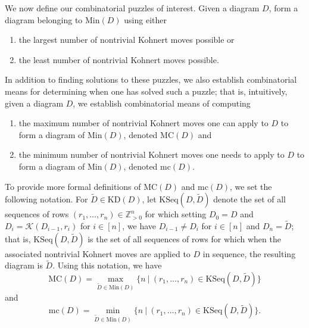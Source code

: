 \documentclass[letterpaper,10pt]{article}
\begin{document}
We now define our combinatorial puzzles of interest. Given a diagram $D$, form a diagram belonging to $\mathrm{Min}(D)$ using either
\begin{enumerate}
    \item[$(1)$] the largest number of nontrivial Kohnert moves possible or
    \item[$(2)$] the least number of nontrivial Kohnert moves possible.
\end{enumerate}
In addition to finding solutions to these puzzles, we also establish combinatorial means for determining when one has solved such a puzzle; that is, intuitively, given a diagram $D$, we establish combinatorial means of computing
\begin{enumerate}
    \item[$(1)$] the maximum number of nontrivial Kohnert moves one can apply to $D$ to form a diagram of $\mathrm{Min}(D)$, denoted $\mathrm{MC}(D)$ and
    \item[$(2)$] the minimum number of nontrivial Kohnert moves one needs to apply to $D$ to form a diagram of $\mathrm{Min}(D)$, denoted $\mathrm{mc}(D)$.
\end{enumerate}
To provide more formal definitions of $\mathrm{MC}(D)$ and $\mathrm{mc}(D)$, we set the following notation. For $\tilde{D}\in\mathrm{KD}(D)$, let $\mathrm{KSeq}(D,\tilde{D})$ denote the set of all sequences of rows $(r_1,\hdots,r_n)\in\mathbb{Z}_{>0}^n$ for which setting $D_0=D$ and $D_i=\mathcal{K}(D_{i-1},r_i)$ for $i\in[n]$, we have $D_{i-1}\neq D_i$ for $i\in [n]$ and $D_n=\tilde{D}$; that is, $\mathrm{KSeq}(D,\tilde{D})$ is the set of all sequences of rows for which when the associated nontrivial Kohnert moves are applied to $D$ in sequence, the resulting diagram is $\tilde{D}$. Using this notation, we have $$\mathrm{MC}(D)=\max_{\tilde{D}\in\mathrm{Min}(D)}\{n~|~(r_1,\hdots,r_n)\in \mathrm{KSeq}(D,\tilde{D})\}$$ and $$\mathrm{mc}(D)=\min_{\tilde{D}\in\mathrm{Min}(D)}\{n~|~(r_1,\hdots,r_n)\in \mathrm{KSeq}(D,\tilde{D})\}.$$
\end{document}
